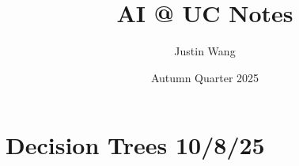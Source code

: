 \documentclass[11pt]{article}
\title{AI @ UC Notes}
\author{Justin Wang}
\date{Autumn Quarter 2025}
\begin{document}
\maketitle

\section{Decision Trees 10/8/25}
\end{document}
